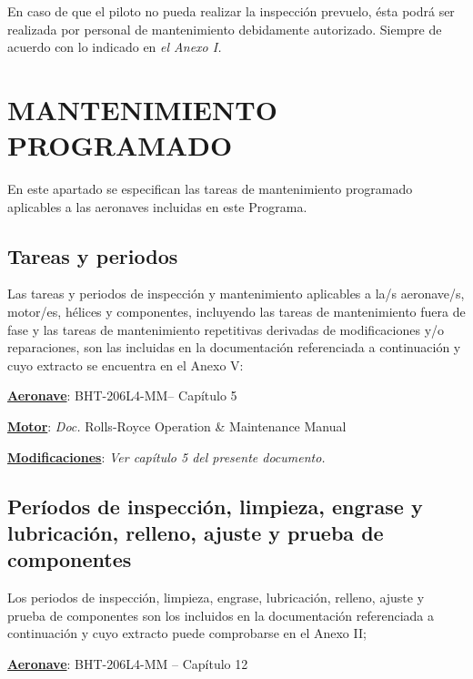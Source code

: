 \documentclass[
]{article}
\begin{document}
En caso de que el piloto no pueda realizar la inspección prevuelo, ésta
podrá ser realizada por personal de mantenimiento debidamente
autorizado. Siempre de acuerdo con lo indicado en \emph{el Anexo I.}

\hypertarget{mantenimiento-programado}{%
\section{MANTENIMIENTO PROGRAMADO}\label{mantenimiento-programado}}

En este apartado se especifican las tareas de mantenimiento programado
aplicables a las aeronaves incluidas en este Programa.

\hypertarget{tareas-y-periodos}{%
\subsection{\texorpdfstring{Tareas y periodos
}{Tareas y periodos }}\label{tareas-y-periodos}}

Las tareas y periodos de inspección y mantenimiento aplicables a la/s
aeronave/s, motor/es, hélices y componentes, incluyendo las tareas de
mantenimiento fuera de fase y las tareas de mantenimiento repetitivas
derivadas de modificaciones y/o reparaciones, son las incluidas en la
documentación referenciada a continuación y cuyo extracto se encuentra
en el Anexo V:

\textbf{\ul{Aeronave}}: BHT-206L4-MM-- Capítulo 5

\textbf{\ul{Motor}}: \emph{Doc.} Rolls-Royce Operation \& Maintenance
Manual

\textbf{\ul{Modificaciones}}: \emph{Ver capítulo 5 del presente
documento.}

\hypertarget{peruxedodos-de-inspecciuxf3n-limpieza-engrase-y-lubricaciuxf3n-relleno-ajuste-y-prueba-de-componentes}{%
\subsection{Períodos de inspección, limpieza, engrase y lubricación,
relleno, ajuste y prueba de
componentes}\label{peruxedodos-de-inspecciuxf3n-limpieza-engrase-y-lubricaciuxf3n-relleno-ajuste-y-prueba-de-componentes}}

Los periodos de inspección, limpieza, engrase, lubricación, relleno,
ajuste y prueba de componentes son los incluidos en la documentación
referenciada a continuación y cuyo extracto puede comprobarse en el
Anexo II;

\textbf{\ul{Aeronave}}: BHT-206L4-MM -- Capítulo 12
\end{document}
